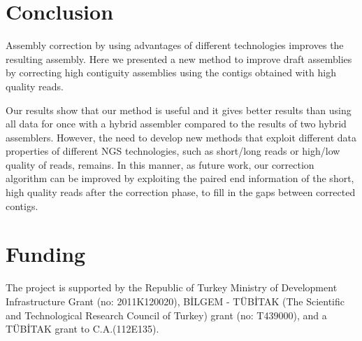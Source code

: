 \documentclass[12pt,a4paper]{cibb}
\begin{document}
\section{\bf Conclusion}

Assembly correction by using advantages of different technologies improves the resulting assembly. Here we presented a new method to improve draft assemblies by correcting high contiguity assemblies using the contigs obtained with high quality reads. 

Our results show that our method is useful and it gives better results than using all data for once with a hybrid assembler compared to the results of two hybrid assemblers. However, the need to develop new methods that exploit different data properties of different NGS technologies, such as short/long reads or high/low quality of reads, remains. In this manner, as future work, our correction algorithm can be improved by exploiting the paired end information of the short, high quality reads after the correction phase, to fill in the gaps between corrected contigs.

\section*{\bf Funding}
The project is supported by the Republic of Turkey Ministry of Development Infrastructure Grant (no: 2011K120020), B\.{I}LGEM \-- T\"{U}B\.{I}TAK (The Scientific and Technological Research Council of Turkey) grant (no: T439000), and a T\"{U}B\.{I}TAK grant to C.A.(112E135).\\
\end{document}
